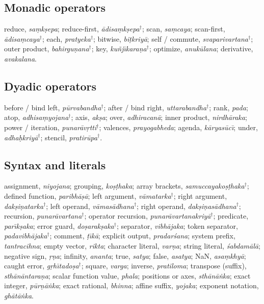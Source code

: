 \documentclass[manuscript, review, anonymous]{acmart}
\begin{document}
\subsection*{Monadic operators}

reduce, \textit{sa{\d{m}}k{\d{s}}epa};
reduce-first, \textit{{\=a}disa{\d{m}}k{\d{s}}epa}$^\dagger$;
scan, \textit{sa{\d{m}}caya};
scan-first, \textit{{\=a}disa{\d{m}}caya}$^\dagger$;
each, \textit{pratyeka}$^\dagger$;
bitwise, \textit{bi{\d{t}}kriy{\=a}};
self / commute, \textit{svaparivartana}$^\dagger$;
outer product, \textit{bahirgu{\d{n}}ana}$^\dagger$;
key, \textit{ku{\~n}j{\=\i}kara{\d{n}}a}$^\dagger$;
optimize, \textit{anuk{\=u}lana};
derivative, \textit{avakalana}.

\subsection*{Dyadic operators}

before / bind left, \textit{p{\=u}rvabandha}$^\dagger$;
after / bind right, \textit{uttarabandha}$^\dagger$;
rank, \textit{pada};
atop, \textit{adhisa{\d{m}}yojana}$^\dagger$;
axis, \textit{ak{\d{s}}a};
over, \textit{adhiracan{\=a}};
inner product, \textit{nirdh{\=a}raka};
power / iteration, \textit{punar{\=a}v{\d{r}}tti}$^\dagger$;
valences, \textit{prayogabheda};
agenda, \textit{k{\=a}ryas{\=u}c{\=\i}};
under, \textit{adha{\d{h}}kriy{\=a}}$^\dagger$;
stencil, \textit{pratir{\=u}pa}$^\dagger$.

\subsection*{Syntax and literals}

assignment, \textit{niyojana};
grouping, \textit{ko{\d{s}}{\d{t}}haka};
array brackets, \textit{samuccayako{\d{s}}{\d{t}}haka}$^\dagger$;
defined function, \textit{paribh{\=a}{\d{s}}{\=a}};
left argument, \textit{v{\=a}matarka}$^\dagger$;
right argument, \textit{dak{\d{s}}i{\d{n}}atarka}$^\dagger$;
left operand, \textit{v{\=a}mas{\=a}dhana}$^\dagger$;
right operand, \textit{dak{\d{s}}i{\d{n}}as{\=a}dhana}$^\dagger$;
recursion, \textit{punar{\=a}vartana}$^\dagger$;
operator recursion, \textit{punar{\=a}vartanakriy{\=a}}$^\dagger$;
predicate, \textit{par{\=\i}k{\d{s}}aka};
error guard, \textit{do{\d{s}}arak{\d{s}}aka}$^\dagger$;
separator, \textit{vibh{\=a}jaka};
token separator, \textit{padavibh{\=a}jaka}$^\dagger$;
comment, \textit{{\d{t}}{\=\i}k{\=a}};
explicit output, \textit{pradar{\'s}ana};
system prefix, \textit{tantracihna};
empty vector, \textit{rikta};
character literal, \textit{var{\d{n}}a};
string literal, \textit{{\'s}abdam{\=a}l{\=a}};
negative sign, \textit{{\d{r}}{\d{n}}a};
infinity, \textit{ananta};
true, \textit{satya};
false, \textit{asatya};
NaN, \textit{asa{\d{m}}khy{\=a}};
caught error, \textit{g{\d{r}}h{\=\i}tado{\d{s}}a}$^\dagger$;
square, \textit{varga};
inverse, \textit{pratiloma};
transpose (suffix), \textit{sth{\=a}n{\=a}ntara{\d{n}}a};
scalar function value, \textit{phala};
positions or axes, \textit{sth{\=a}n{\=a}{\.n}ka};
exact integer, \textit{p{\=u}r{\d{n}}{\=a}{\.n}ka};
exact rational, \textit{bhinna};
affine suffix, \textit{yojaka};
exponent notation, \textit{gh{\=a}t{\=a}{\.n}ka}.
\end{document}
